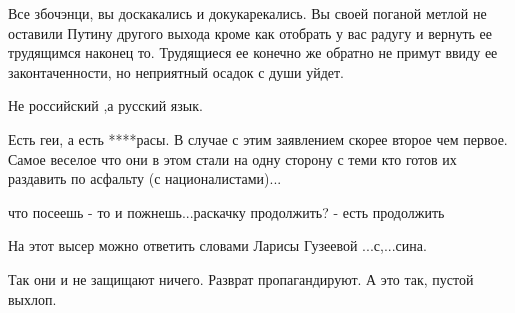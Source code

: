 \begin{itemize}
Все збочэнци, вы доскакались и докукарекались. Вы своей поганой метлой не
оставили Путину другого выхода кроме как отобрать у вас радугу и вернуть ее
трудящимся наконец то. Трудящиеся ее конечно же обратно не примут ввиду ее
законтаченности, но неприятный осадок с души уйдет.


 
Не российский ,а русский язык.

 
Есть геи, а есть ****расы. В случае с этим заявлением скорее второе чем первое. Самое веселое что они в этом стали на одну сторону с теми кто готов их раздавить по асфальту (с националистами)...

 
что посеешь - то и пожнешь...раскачку продолжить? - есть продолжить

 
На этот высер можно ответить словами Ларисы Гузеевой ...с,...сина.

 
Так они и не защищают ничего. Разврат пропагандируют. А это так, пустой выхлоп.

 

\end{itemize}
